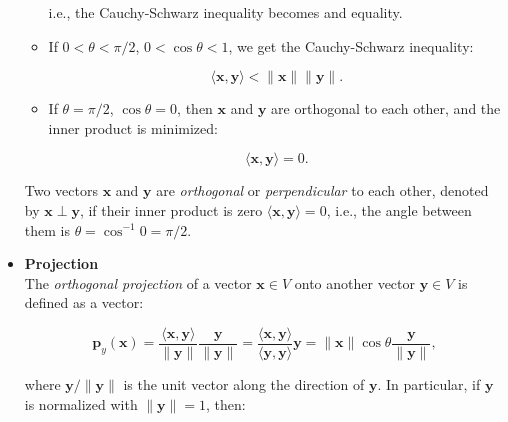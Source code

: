 \documentclass[10pt,b5paper,titlepage]{book}
\begin{document}
\begin{itemize}
\begin{itemize}
                i.e., the Cauchy-Schwarz inequality becomes and equality.\\

            \item If $0 < \theta < \pi / 2$,  $0 < \cos \theta < 1$, we
                get the Cauchy-Schwarz inequality:

                \begin{equation}
                    \langle \mathbf{x}, \mathbf{y} \rangle
                    < \|\mathbf{x}\| \|\mathbf{y}\|
                .\end{equation}

            \item If $\theta = \pi / 2$,  $\cos \theta = 0$, then
                $\mathbf{x}$ and $\mathbf{y}$ are orthogonal to each
                other, and the inner product is minimized:

                \begin{equation}
                    \langle \mathbf{x}, \mathbf{y} \rangle = 0
                .\end{equation}

        \end{itemize}

        Two vectors $\mathbf{x}$ and $\mathbf{y}$ are \textit{orthogonal}
        or \textit{perpendicular} to each other, denoted by
        $\mathbf{x} \perp \mathbf{y}$, if their inner
        product is zero $\langle \mathbf{x}, \mathbf{y} \rangle = 0$,
        i.e., the angle between them is
        $\theta = \cos^{-1} 0 = \pi / 2$.

    \item \textbf{Projection}\\

        The \textit{orthogonal projection} of a vector $\mathbf{x} \in V$
        onto another vector $\mathbf{y} \in V$ is defined as a vector:

        \begin{equation}
            \mathbf{p}_{y}(\mathbf{x})
            = \frac{\langle \mathbf{x}, \mathbf{y} \rangle}{\|\mathbf{y}\|}
            \frac{\mathbf{y}}{\|\mathbf{y}\|}
            = \frac{\langle \mathbf{x}, \mathbf{y} \rangle}{\langle \mathbf{y}, \mathbf{y} \rangle} \mathbf{y}
            = \|\mathbf{x}\| \cos \theta \frac{\mathbf{y}}{\|\mathbf{y}\|}
        ,\end{equation}

        where $\mathbf{y} / \|\mathbf{y}\|$ is the unit vector along
        the direction of $\mathbf{y}$. In particular, if $\mathbf{y}$
        is normalized with $\|\mathbf{y}\| = 1$, then:


\end{itemize}
\end{document}

